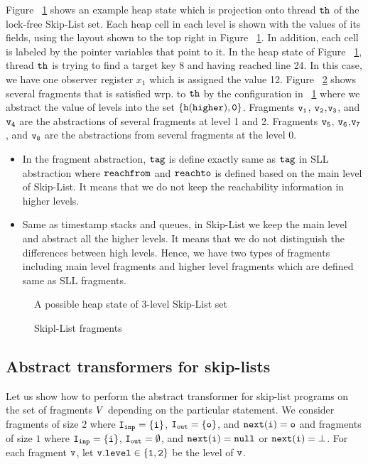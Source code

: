  Figure ~\ref{skiplistshape} shows an example heap state which is projection onto thread ${\tt th}$ of the lock-free Skip-List set. Each heap cell in each level is shown with the values of its fields, using the layout shown to the top right in Figure ~\ref{skiplistshape}. In addition, each cell is labeled by the pointer variables that point to it. 
In the heap state of Figure ~\ref{skiplistshape}, thread ${\tt th}$ is trying to find a target key 8 and having reached line 24. In this case, we have one observer register $x_1$ which is assigned the value 12. Figure ~\ref{skiplistabs} shows several fragments that is satisfied wrp. to ${\tt th}$ by the configuration in ~\ref{skiplistshape} where we abstract the value of levels into the set $\left\{{\tt h(higher)},{\tt 0}\right\}$. Fragments $\tt v_1$, $\tt v_2$,$\tt v_3$, and $\tt v_4$ are the abstractions of several fragments at level 1 and 2. Fragments $\tt v_5$, $\tt v_6$,$\tt v_7$, and $\tt v_8$ are the abstractions from several fragments at the level 0.
 
 
   
   \begin{itemize}
  \item In the fragment abstraction, $\tt tag$ is define exactly same as $\tt tag$ in SLL abstraction where $\mathtt{reachfrom}$ and $\mathtt{reachto}$ is defined based on the main level of Skip-List. It means that we do not keep the reachability information in higher levels.
  \item Same as timestamp stacks and queues, in Skip-List we keep the main level and abstract all the higher levels. It means that we do not distinguish the differences between high levels. Hence, we have two types of fragments including main level fragments and higher level fragments which are defined same as SLL fragments. 
   \end{itemize}
 \begin{figure}  
   
 \caption{A possible heap state of 3-level Skip-List set}
 \label{skiplistshape}
\end{figure}

 \begin{figure}  
  
 \caption{Skipl-List fragments}
 \label{skiplistabs}
\end{figure}
\subsection{Abstract transformers for skip-lists}
Let us show how to perform the abstract transformer for skip-list programs on the set of fragments $V$ depending on the particular statement.  We consider fragments of size $2$ where $\tt I_{inp} = \{i\}$, $\tt I_{out} = \{{o}\}$, and $\tt next(i) = {o}$ and fragments of size $1$ where $\tt I_{inp} = \{i\}$, $\tt I_{out} = \emptyset$, and $\tt next(i) = null$ or $\tt next(i) = \bot$. For each fragment $\tt v$, let $\tt v.level \in \{1,2\}$ be the level of $\tt v$.


